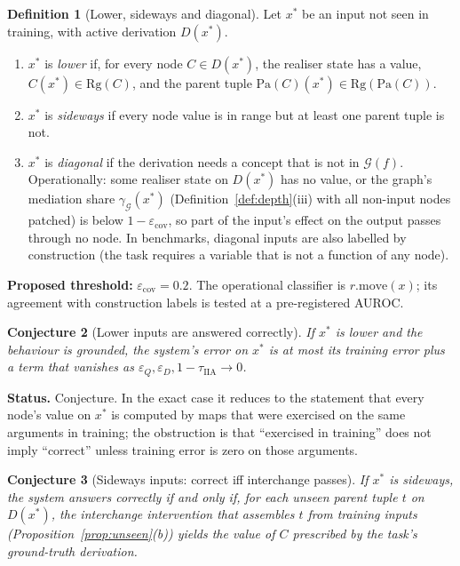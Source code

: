 \documentclass[11pt]{article}
\theoremstyle{definition}
\newtheorem{definition}{Definition}[section]
\theoremstyle{plain}
\newtheorem{conjecture}[definition]{Conjecture}
\theoremstyle{remark}
\newcommand{\pa}{\mathrm{Pa}}
\newcommand{\G}{\mathcal{G}}
\newcommand{\IIA}{\mathrm{IIA}}
\newcommand{\status}[1]{\par\noindent\textbf{Status.} #1}
\begin{document}
\begin{definition}[Lower, sideways and diagonal]\label{def:moves}
Let $x^\ast$ be an input not seen in training, with active derivation
$D(x^\ast)$.
\begin{enumerate}[label=(\roman*)]
\item $x^\ast$ is \emph{lower} if, for every node $C\in D(x^\ast)$, the
realiser state has a value, $C(x^\ast)\in\mathrm{Rg}(C)$, and the parent tuple
$\pa(C)(x^\ast)\in\mathrm{Rg}(\pa(C))$.
\item $x^\ast$ is \emph{sideways} if every node value is in range but at
least one parent tuple is not.
\item $x^\ast$ is \emph{diagonal} if the derivation needs a concept that is
not in $\G(f)$. Operationally: some realiser state on $D(x^\ast)$ has no value,
or the graph's mediation share
$\gamma_{\G}(x^\ast)$ (Definition~\ref{def:depth}(iii) with all non-input nodes patched)
is below $1-\varepsilon_{\mathrm{cov}}$, so part of the input's effect on the
output passes through no node. In benchmarks, diagonal inputs are also
labelled by construction (the task requires a variable that is not a function
of any node).
\end{enumerate}
\textbf{Proposed threshold:} $\varepsilon_{\mathrm{cov}}=0.2$. The
operational classifier is $r.\mathrm{move}(x)$; its agreement with
construction labels is tested at a pre-registered AUROC.
\end{definition}

\begin{conjecture}[Lower inputs are answered correctly]\label{conj:lower}
If $x^\ast$ is lower and the behaviour is grounded, the system's error on
$x^\ast$ is at most its training error plus a term that vanishes as
$\varepsilon_Q,\varepsilon_D,1-\tau_{\IIA}\to0$.
\end{conjecture}
\status{Conjecture. In the exact case it reduces to the statement that every
node's value on $x^\ast$ is computed by maps that were exercised on the same
arguments in training; the obstruction is that ``exercised in training'' does
not imply ``correct'' unless training error is zero on those arguments.}

\begin{conjecture}[Sideways inputs: correct iff interchange passes]
\label{conj:sideways}
If $x^\ast$ is sideways, the system answers correctly if and only if, for
each unseen parent tuple $t$ on $D(x^\ast)$, the interchange intervention that
assembles $t$ from training inputs (Proposition~\ref{prop:unseen}(b)) yields the value
of $C$ prescribed by the task's ground-truth derivation.
\end{conjecture}
\end{document}
